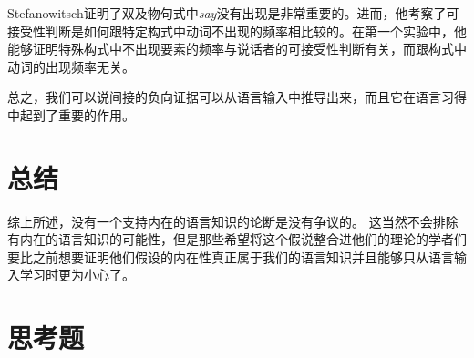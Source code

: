 Stefanowitsch证明了双及物句式中\emph{say}没有出现是非常重要的。进而，他考察了可接受性判断是如何跟特定构式中动词不出现的频率相比较的。在第一个实验中，他能够证明特殊构式中不出现要素的频率与说话者的可接受性判断有关，而跟构式中动词的出现频率无关。

总之，我们可以说间接的负向证据可以从语言输入中推导出来，而且它在语言习得中起到了重要的作用。
% 

\section{总结}

综上所述，没有一个支持内在的语言知识的论断是没有争议的。
这当然不会排除有内在的语言知识的可能性，但是那些希望将这个假说整合进他们的理论的学者们要比之前想要证明他们假设的内在性真正属于我们的语言知识并且能够只从语言输入学习时更为小心了。
%


\section*{思考题}

